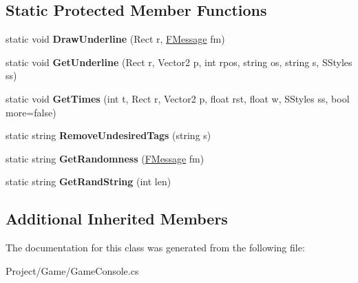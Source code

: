 \subsection*{Static Protected Member Functions}
\begin{DoxyCompactItemize}
\item 
\mbox{\label{class_lerp2_a_p_i_1_1_game_1_1_game_console_a84e2cf57f5ee57c0a042acf4f518aaca}} 
static void {\bfseries Draw\+Underline} (Rect r, \hyperlink{class_lerp2_a_p_i_1_1_game_1_1_game_console_1_1_f_message}{F\+Message} fm)
\item 
\mbox{\label{class_lerp2_a_p_i_1_1_game_1_1_game_console_a245885636c5511d933447fe974e92ee0}} 
static void {\bfseries Get\+Underline} (Rect r, Vector2 p, int rpos, string os, string s, S\+Styles ss)
\item 
\mbox{\label{class_lerp2_a_p_i_1_1_game_1_1_game_console_a75599c8ffeadc3a8e3d6de281cb423f8}} 
static void {\bfseries Get\+Times} (int t, Rect r, Vector2 p, float rst, float w, S\+Styles ss, bool more=false)
\item 
\mbox{\label{class_lerp2_a_p_i_1_1_game_1_1_game_console_a56a8eb8fafe2c8a5d23f472e52d286d1}} 
static string {\bfseries Remove\+Undesired\+Tags} (string s)
\item 
\mbox{\label{class_lerp2_a_p_i_1_1_game_1_1_game_console_ad5a542bb0dcc8d1ffd261456daeaf1c8}} 
static string {\bfseries Get\+Randomness} (\hyperlink{class_lerp2_a_p_i_1_1_game_1_1_game_console_1_1_f_message}{F\+Message} fm)
\item 
\mbox{\label{class_lerp2_a_p_i_1_1_game_1_1_game_console_a1f9e983b12a68fd8112d955cf952ae08}} 
static string {\bfseries Get\+Rand\+String} (int len)
\end{DoxyCompactItemize}
\subsection*{Additional Inherited Members}


The documentation for this class was generated from the following file\+:\begin{DoxyCompactItemize}
\item 
Project/\+Game/Game\+Console.\+cs\end{DoxyCompactItemize}
